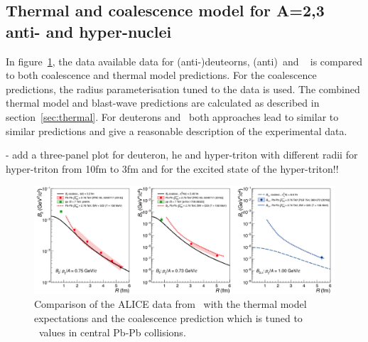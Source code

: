 \documentclass[a4paper,11pt]{scrartcl} %
\begin{document}
 
 
 \subsection{Thermal and coalescence model for A=2,3 anti- and hyper-nuclei}

In figure~\ref{fig:CompareThermalAndCoalescence}, the data available data for (anti-)deuteorns, (anti)\hethree\ and \hthreelambda~\cite{Adam:2015yta} is compared to both coalescence and thermal model predictions. For the coalescence predictions, the radius parameterisation tuned to the data is used. The combined thermal model and blast-wave predictions are calculated as described in section~\ref{sec:thermal}. For deuterons and \hethree\ both approaches lead to similar to similar predictions and give a reasonable description of the experimental data.

 - add a three-panel plot for deuteron, he and hyper-triton with different radii for hyper-triton from 10fm to 3fm and for the excited state of the hyper-triton!!


\begin{figure}[htbp]
	\begin{center}
		\includegraphics[width=\textwidth]{compareThermalAndCoalescence.png}
		\caption{Comparison of the ALICE data from~\cite{ALICE:deuteronppPbPb2015,ALICE:nucleipp2017} with the thermal model expectations and the coalescence prediction which is tuned to \btwo\ values in central Pb-Pb collisions.}
		\label{fig:CompareThermalAndCoalescence}
	\end{center}
\end{figure}

 
\end{document}
